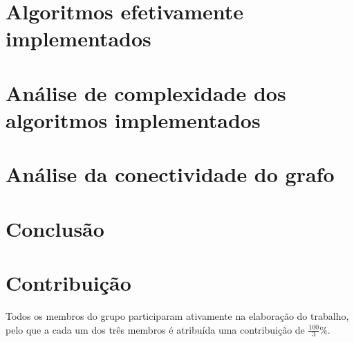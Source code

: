 \documentclass[12pt,a4paper]{report}
\begin{document}
\chapter{Algoritmos efetivamente implementados}



\chapter{Análise de complexidade dos algoritmos implementados}



\chapter{Análise da conectividade do grafo}



\chapter{Conclusão}



\chapter{Contribuição}
Todos os membros do grupo participaram ativamente na elaboração do trabalho, pelo que a cada um dos três membros é atribuída uma contribuição de \( \frac{100}{3} \% \).
\end{document}
